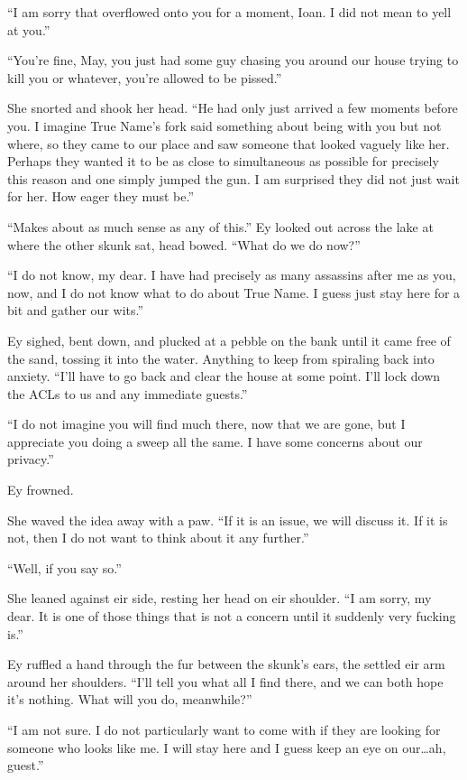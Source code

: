 ``I am sorry that overflowed onto you for a moment, Ioan. I did not mean to yell at you.''

``You're fine, May, you just had some guy chasing you around our house trying to kill you or whatever, you're allowed to be pissed.''

She snorted and shook her head. ``He had only just arrived a few moments before you. I imagine True Name's fork said something about being with you but not where, so they came to our place and saw someone that looked vaguely like her. Perhaps they wanted it to be as close to simultaneous as possible for precisely this reason and one simply jumped the gun. I am surprised they did not just wait for her. How eager they must be.''

``Makes about as much sense as any of this.'' Ey looked out across the lake at where the other skunk sat, head bowed. ``What do we do now?''

``I do not know, my dear. I have had precisely as many assassins after me as you, now, and I do not know what to do about True Name. I guess just stay here for a bit and gather our wits.''

Ey sighed, bent down, and plucked at a pebble on the bank until it came free of the sand, tossing it into the water. Anything to keep from spiraling back into anxiety. ``I'll have to go back and clear the house at some point. I'll lock down the ACLs to us and any immediate guests.''

``I do not imagine you will find much there, now that we are gone, but I appreciate you doing a sweep all the same. I have some concerns about our privacy.''

Ey frowned.

She waved the idea away with a paw. ``If it is an issue, we will discuss it. If it is not, then I do not want to think about it any further.''

``Well, if you say so.''

She leaned against eir side, resting her head on eir shoulder. ``I am sorry, my dear. It is one of those things that is not a concern until it suddenly very fucking is.''

Ey ruffled a hand through the fur between the skunk's ears, the settled eir arm around her shoulders. ``I'll tell you what all I find there, and we can both hope it's nothing. What will you do, meanwhile?''

``I am not sure. I do not particularly want to come with if they are looking for someone who looks like me. I will stay here and I guess keep an eye on our\ldots ah, guest.''

